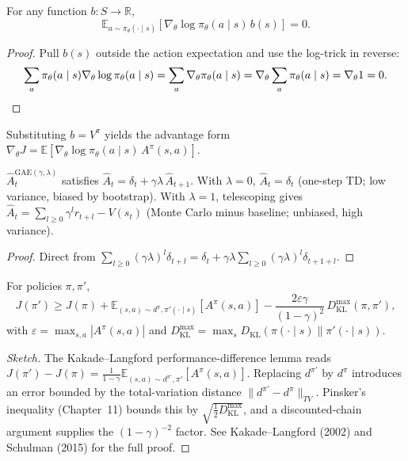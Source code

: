 \begin{lemma}
\label{lem:baseline}
For any function $b:S\to\mathbb{R}$,
\[
\mathbb{E}_{a\sim\pi_\theta(\cdot\mid s)}[\nabla_\theta\log\pi_\theta(a\mid s)\,b(s)]=0.
\]
\end{lemma}

\begin{proof}
Pull $b(s)$ outside the action expectation and use the log-trick in reverse:
\[
\sum_a\pi_\theta(a\mid s)\nabla_\theta\log\pi_\theta(a\mid s)=\sum_a\nabla_\theta\pi_\theta(a\mid s)=\nabla_\theta\sum_a\pi_\theta(a\mid s)=\nabla_\theta 1=0. \qedhere
\]
\end{proof}

Substituting $b=V^\pi$ yields the advantage form $\nabla_\theta J=\mathbb{E}[\nabla_\theta\log\pi_\theta(a\mid s)\,A^\pi(s,a)]$.

\begin{lemma}
$\hat A_t^{\mathrm{GAE}(\gamma,\lambda)}$ satisfies $\hat A_t=\delta_t+\gamma\lambda\,\hat A_{t+1}$. With $\lambda=0$, $\hat A_t=\delta_t$ (one-step TD; low variance, biased by bootstrap). With $\lambda=1$, telescoping gives $\hat A_t=\sum_{l\geq 0}\gamma^l r_{t+l}-V(s_t)$ (Monte Carlo minus baseline; unbiased, high variance).
\end{lemma}

\begin{proof}
Direct from $\sum_{l\geq 0}(\gamma\lambda)^l\delta_{t+l}=\delta_t+\gamma\lambda\sum_{l\geq 0}(\gamma\lambda)^l\delta_{t+1+l}$.
\end{proof}

\begin{theorem}
For policies $\pi,\pi'$,
\[
J(\pi')\geq J(\pi)+\mathbb{E}_{(s,a)\sim d^\pi,\pi'(\cdot\mid s)}\!\left[A^\pi(s,a)\right]-\frac{2\varepsilon\gamma}{(1-\gamma)^2}\,D_{\mathrm{KL}}^{\max}(\pi,\pi'),
\]
with $\varepsilon=\max_{s,a}|A^\pi(s,a)|$ and $D_{\mathrm{KL}}^{\max}=\max_s D_{\mathrm{KL}}(\pi(\cdot\mid s)\|\pi'(\cdot\mid s))$.
\end{theorem}

\begin{proof}[Sketch]
The Kakade--Langford performance-difference lemma reads $J(\pi')-J(\pi)=\frac{1}{1-\gamma}\mathbb{E}_{(s,a)\sim d^{\pi'},\pi'}[A^\pi(s,a)]$. Replacing $d^{\pi'}$ by $d^\pi$ introduces an error bounded by the total-variation distance $\|d^{\pi'}-d^\pi\|_{TV}$. Pinsker's inequality (Chapter~11) bounds this by $\sqrt{\tfrac12 D_{\mathrm{KL}}^{\max}}$, and a discounted-chain argument supplies the $(1-\gamma)^{-2}$ factor. See Kakade--Langford (2002) and Schulman (2015) for the full proof.
\end{proof}

